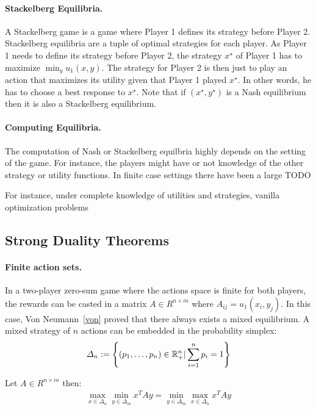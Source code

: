 \paragraph{Stackelberg Equilibria.} A Stackelberg game is a game where Player 1 defines its strategy before Player 2. Stackelberg equilibria are a tuple of optimal strategies for each player. As Player 1 needs to define its strategy before Player 2, the strategy $x^\star$ of Player 1 has to maximize $\min_y u_1(x,y)$. The strategy for Player 2 is then just to play an action that maximizes its utility given that Player 1 played $x^\star$. In other words, he has to choose a best response to $x^\star$. Note that if $(x^\star,y^\star)$ is a Nash equilibrium then it is also a Stackelberg equilibrium.


\paragraph{Computing Equilibria.} The computation of Nash or Stackelberg equilbria highly depends on the setting of the game. For instance, the players might have or not knowledge of the other strategy or utility functions. In finite case settings there have been a large  TODO

For instance, under complete knowledge of utilities and strategies, vanilla optimization problems 

\subsection{Strong Duality Theorems}

\paragraph{Finite action sets.} In a two-player zero-sum game where the actions space is finite for both players, the rewards can be casted in a matrix $A\in R^{n\times m}$ where $A_{ij} =u_1(x_i,y_j)$. In this case, Von Neumann~\ref{von} proved that there always exists a mixed equilibrium. A mixed strategy of $n$ actions can be embedded in the probability simplex:
\begin{align*}
    \Delta_n := \left\{(p_1,\dots,p_n)\in\RR_+^n| \sum_{i=1}^n p_i = 1  \right\}
\end{align*}

\begin{thm}
    Let $A\in R^{n\times m}$ then:
    \begin{align*}
        \max_{x\in \Delta_n}\min_{y\in \Delta_m} x^TAy = \min_{y\in \Delta_m}\max_{x\in \Delta_n} x^TAy
    \end{align*}
\end{thm}

